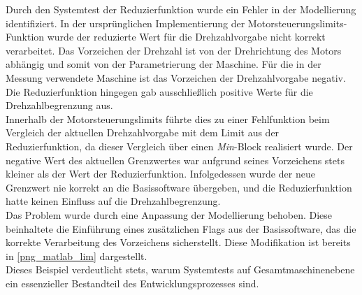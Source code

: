 Durch den Systemtest der Reduzierfunktion wurde ein Fehler in der Modellierung identifiziert. In der ursprünglichen Implementierung der Motorsteuerungslimits-Funktion wurde der reduzierte Wert für die Drehzahlvorgabe nicht korrekt verarbeitet. Das Vorzeichen der Drehzahl ist von der Drehrichtung des Motors abhängig und somit von der Parametrierung der Maschine. Für die in der Messung verwendete Maschine ist das Vorzeichen der Drehzahlvorgabe negativ. Die Reduzierfunktion hingegen gab ausschließlich positive Werte für die Drehzahlbegrenzung aus. \\
Innerhalb der Motorsteuerungslimits führte dies zu einer Fehlfunktion beim Vergleich der aktuellen Drehzahlvorgabe mit dem Limit aus der Reduzierfunktion, da dieser Vergleich über einen \textit{Min}-Block realisiert wurde. Der negative Wert des aktuellen Grenzwertes war aufgrund seines Vorzeichens stets kleiner als der Wert der Reduzierfunktion. Infolgedessen wurde der neue Grenzwert nie korrekt an die Basissoftware übergeben, und die Reduzierfunktion hatte keinen Einfluss auf die Drehzahlbegrenzung. \\
Das Problem wurde durch eine Anpassung der Modellierung behoben. Diese beinhaltete die Einführung eines zusätzlichen Flags aus der Basissoftware, das die korrekte Verarbeitung des Vorzeichens sicherstellt. Diese Modifikation ist bereits in \autoref{png_matlab_lim} dargestellt. \\
Dieses Beispiel verdeutlicht stets, warum Systemtests auf Gesamtmaschinenebene ein essenzieller Bestandteil des Entwicklungsprozesses sind.

